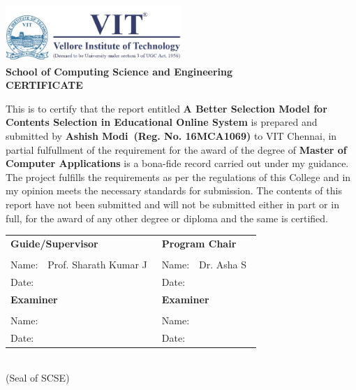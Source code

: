 %
\vspace*{\fill}
\begin{center}
%
%
%
\includegraphics[width=0.50\textwidth] {logo.png}\\
%
{\large \bf School of Computing Science and Engineering}\\ [1.5cm]

%
{\Large \bf CERTIFICATE}\\[0.75cm]
%
\end{center}

%
%
This is to certify that the report entitled {\bf A Better Selection Model for Contents Selection in Educational Online System} is prepared and 
submitted by {\bf Ashish Modi\  
(Reg. No. 16MCA1069)} 
to VIT Chennai, in partial fulfullment of the requirement for the award of
the degree of {\bf Master of Computer Applications} 
is a bona-fide record carried out under my guidance.
The project fulfills the requirements as per the regulations of this
College and in my opinion meets the necessary standards for submission.
The contents of this report have not been submitted and will not be submitted
either in part or in full, for the award of any other degree or diploma
and the same is certified.
\\[0.5 cm]
%
%
\begin{center}
\begin{tabular}{p{1cm} p{5cm} p{1cm} p{7cm}}
%
\multicolumn{2}{l}{\bf Guide/Supervisor}         &\multicolumn{2}{l}{\bf Program Chair}   \\
%
     &     &            &  \\
%
Name: &  {Prof. Sharath Kumar J\ }        & Name: & {Dr. Asha S\ } \\
%
Date:  &       & Date:  &      \\ [1.5cm]
%
\multicolumn{2}{l}{\bf Examiner}         &\multicolumn{2}{l}{\bf Examiner}   \\
     &     &            &  \\

%
Name: &        & Name:   &      \\
%
Date:  &       & Date:  &      \\ 



%  
\end{tabular}
\\[1.5cm]
%
%
{\small (Seal of SCSE)}
\end{center} 
%
%
%  